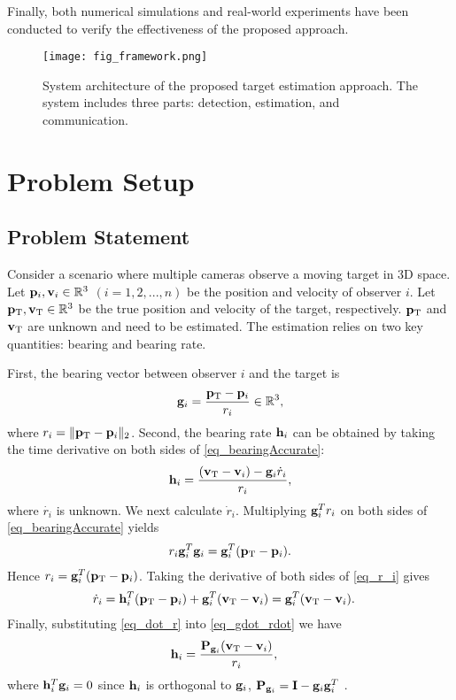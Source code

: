\documentclass[letterpaper, 10 pt, conference]{ieeeconf}  %
\begin{document}
Finally, both numerical simulations and real-world experiments have been conducted to verify the effectiveness of the proposed approach. 
\begin{figure*}
\centering
\texttt{[image: fig\_framework.png]}
\caption{System architecture of the proposed target estimation approach. The system includes three parts: detection, estimation, and communication.}
\label{fig_framework}
\end{figure*}

\section{Problem Setup}\label{sec_prob}

\subsection{Problem Statement}\label{subsec_prob_state}

Consider a scenario where multiple cameras observe a moving target in 3D space.
Let $\mathbf{p}_i, \mathbf{v}_i\in\mathbb{R}^3$ $(i = 1, 2, ..., n)$ be the position and velocity of observer $i$.
Let $\mathbf{p}_{{\rm T}}, \mathbf{v}_{{\rm T}} \in\mathbb{R}^3$ be the true position and velocity of the target, respectively. $\mathbf{p}_{{\rm T}}$ and $\mathbf{v}_{{\rm T}}$ are unknown and need to be estimated. The estimation relies on two key quantities: bearing and bearing rate.

First, the bearing vector between observer $i$ and the target is
\begin{align}
\mathbf{g}_i = \frac{\mathbf{p}_{{\rm T}} - \mathbf{p}_i}{r_i}\in\mathbb{R}^3,
\label{eq_bearingAccurate}
\end{align}
where $r_i = \|\mathbf{p}_{{\rm T}} - \mathbf{p}_i\|_2$.
Second, the bearing rate $\mathbf{h}_i$ can be obtained by taking the time derivative on both sides of \eqref{eq_bearingAccurate}:
\begin{align}
	\mathbf{h}_i
 = \frac{(\mathbf{v}_{{\rm T}} - \mathbf{v}_i) - \mathbf{g}_i\dot{r}_i}{r_i}, \label{eq_gdot_rdot}
\end{align}
where $\dot{r_i}$ is unknown. We next calculate $\dot{r}_i$. Multiplying $\mathbf{g}_i^Tr_i$ on both sides of \eqref{eq_bearingAccurate} yields 
\begin{align}
    r_i \mathbf{g}_i^T\mathbf{g}_i = \mathbf{g}_i^T(\mathbf{p}_{\rm T} - \mathbf{p}_i).\label{eq_r_i}
\end{align}
Hence $r_i =\mathbf{g}_i^T(\mathbf{p}_{\rm T} - \mathbf{p}_i)$.
Taking the derivative of both sides of \eqref{eq_r_i} gives
\begin{align}
	\dot{r}_i & = \mathbf{h}^T_i(\mathbf{p}_{{\rm T}} - \mathbf{p}_i) + \mathbf{g}^T_i(\mathbf{v}_{\rm T} - \mathbf{v}_i) 
= \mathbf{g}^T_i(\mathbf{v}_{\rm T} - \mathbf{v}_i). \label{eq_dot_r}
\end{align}
Finally, substituting \eqref{eq_dot_r} into \eqref{eq_gdot_rdot} we have
\begin{align}
\mathbf{h}_i& = \frac{\mathbf{P}_{\mathbf{g}_i} (\mathbf{v}_{\rm T} - \mathbf{v}_i)}{r_i}, \label{eq_gdot}
\end{align}
where \(\mathbf{h}_i^T\mathbf{g}_i=0\) since  $\mathbf{h}_i$ is orthogonal to $\mathbf{g}_i$,  $\mathbf{P}_{\mathbf{g}_i} = \mathbf{I} - \mathbf{g}_i\mathbf{g}^T_i$ \cite{zhao2019bearing}. 
\end{document}
